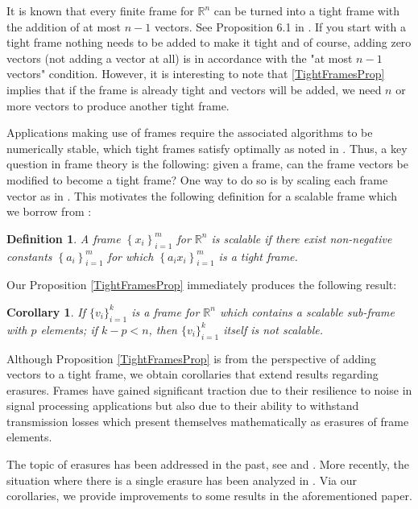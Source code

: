 \documentclass[11pt, reqno]{amsart}
\providecommand{\R}{\mathbb R}
\newtheorem{definition}[theorem]{Definition}
\newtheorem{corollary}{Corollary}[theorem]
\numberwithin{equation}{section}
\begin{document}
It is known that every finite frame for $\R^n$ can be turned into a tight frame with the addition of at most $n-1$ vectors. See Proposition 6.1 in \cite{Casazza2016}. If you start with a tight frame nothing needs to be added to make it tight and of course, adding zero vectors (not adding a vector at all) is in accordance with the "at most $n-1$ vectors" condition. However, it is interesting to note that \ref{TightFramesProp} implies that if the frame is already tight and vectors will be added, we need $n$ or more vectors to produce another tight frame. 

Applications making use of frames require the associated algorithms to be numerically stable, which tight frames satisfy optimally as noted in \cite{KUTYNIOK2013}. Thus, a key question in frame theory is the following: given a frame, can the frame vectors be modified to become a tight frame? One way to do so is by scaling each frame vector as in \cite{DeCarliCassaza}. This motivates the following definition for a scalable frame which we borrow from \cite{DeCarliCassaza}:

\begin{definition}
	A frame $\left\{x_i\right\}_{i=1}^{m}$ for $\R^n$ is scalable if there exist non-negative constants $\left\{a_i\right\}_{i=1}^{m}$ for which $\left\{a_i x_i\right\}_{i=1}^{m}$ is a tight frame.
\end{definition}

Our Proposition \ref{TightFramesProp} immediately produces the following result:

\begin{corollary}
	If $\{v_i\}_{i=1}^k$ is a frame for $\R^n$ which contains a scalable sub-frame with $p $ elements; if $k-p<n$, then $\{v_i\}_{i=1}^k$ itself is not scalable.
\end{corollary}

Although Proposition \ref{TightFramesProp} is from the perspective of adding vectors to a tight frame, we obtain corollaries that extend results regarding erasures. Frames have gained significant traction due to their resilience to noise in signal processing applications but also due to their ability to withstand transmission losses which present themselves mathematically as erasures of frame elements.

The topic of erasures has been addressed in the past, see \cite{GOYAL2001} and \cite{HOLMES2004}. More recently, the situation where there is a single erasure has been analyzed in \cite{Datta2020}. Via our corollaries, we provide improvements to some results in the aforementioned paper. 
\end{document}
